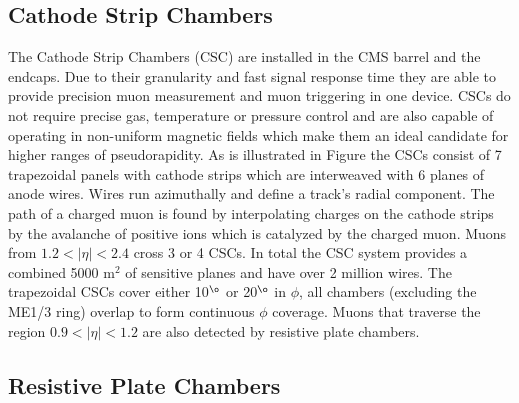 \subsection{Cathode Strip Chambers}
The Cathode Strip Chambers (CSC) are installed in the CMS barrel and the endcaps.
Due to their granularity and fast signal response time they are able to provide precision muon 
measurement and muon triggering in one device. 
CSCs do not require precise gas, temperature or pressure control and
are also capable of operating
in non-uniform magnetic fields which make them an ideal candidate for higher
ranges of pseudorapidity. 
As is illustrated in Figure %
the CSCs consist of 7 trapezoidal panels with cathode strips which are interweaved with
6 planes of anode wires. Wires run azimuthally and define a track's 
radial component. The path of a charged muon is found by interpolating charges
on the cathode strips by the avalanche of positive ions which is catalyzed by
the charged muon. 
Muons from $1.2<|\eta|<2.4$ cross 3 or 4 CSCs. In total the CSC system provides
a combined 5000 m$^2$ of sensitive planes and have over 2 million wires.
The trapezoidal CSCs cover either 10$^{\o}$ or 20$^{\o}$ in $\phi$, all chambers
(excluding the ME1/3 ring) overlap to form continuous $\phi$ coverage.
Muons that traverse the region $0.9<|\eta|<1.2$ are also detected by resistive plate chambers. 
\subsection{Resistive Plate Chambers}
